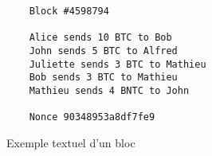 \begin{figure}
  \begin{verbatim}
    Block #4598794

    Alice sends 10 BTC to Bob
    John sends 5 BTC to Alfred
    Juliette sends 3 BTC to Mathieu
    Bob sends 3 BTC to Mathieu
    Mathieu sends 4 BNTC to John

    Nonce 90348953a8df7fe9
  \end{verbatim}

  \caption{Exemple textuel d'un bloc}
\end{figure}